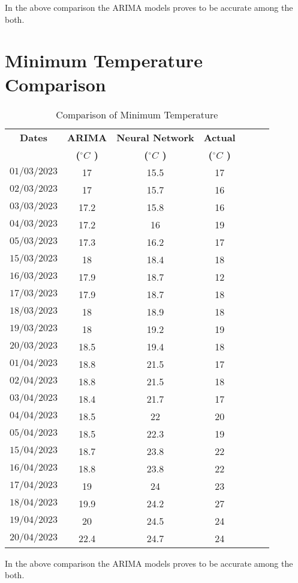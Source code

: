 In the above comparison the ARIMA models proves to be accurate among the both.
\pagebreak



\section{Minimum Temperature Comparison}
\begin{table}[h]
\centering
\caption{Comparison of Minimum Temperature}
\begin{tabular}{ccccccc}
\toprule
\textbf{Dates} & \textbf{ARIMA} & \textbf{Neural Network} & \textbf{Actual}   \\
\textbf{} & \textbf{($^{\circ}C$ )}       & \textbf{($^{\circ}C$ )}        & \textbf{($^{\circ}C$ )}  \\
\hline
$01/03/2023$ & 17 & 15.5 & 17 \\
\hline
$02/03/2023$ & 17 & 15.7 & 16 \\
\hline
$03/03/2023$ & 17.2 & 15.8 & 16 \\
\hline
$04/03/2023$ & 17.2 & 16 & 19 \\
\hline
$05/03/2023$ & 17.3 & 16.2 & 17 \\
\hline
$15/03/2023$ & 18 & 18.4 & 18 \\
\hline
$16/03/2023$ & 17.9 & 18.7 & 12 \\
\hline
$17/03/2023$ & 17.9 & 18.7 & 18 \\
\hline
$18/03/2023$ & 18 & 18.9 & 18 \\
\hline
$19/03/2023$ & 18 & 19.2 & 19 \\
\hline
$20/03/2023$ & 18.5 & 19.4 & 18 \\
\hline
$01/04/2023$ & 18.8 & 21.5 & 17 \\
\hline
$02/04/2023$ & 18.8 & 21.5 & 18 \\
\hline
$03/04/2023$ & 18.4 & 21.7 & 17 \\
\hline
$04/04/2023$ & 18.5 & 22 & 20 \\
\hline
$05/04/2023$ & 18.5 & 22.3 & 19 \\
\hline
$15/04/2023$ & 18.7 & 23.8 & 22 \\
\hline
$16/04/2023$ & 18.8 & 23.8 & 22 \\
\hline
$17/04/2023$ & 19 & 24 & 23\\
\hline
$18/04/2023$ & 19.9 & 24.2 & 27 \\
\hline
$19/04/2023$ & 20 & 24.5 & 24 \\
\hline
$20/04/2023$ & 22.4 & 24.7 & 24 \\
\bottomrule
\end{tabular}
\end{table}
In the above comparison the ARIMA models proves to be accurate among the both.
\pagebreak
\\
\\
\\
\\


